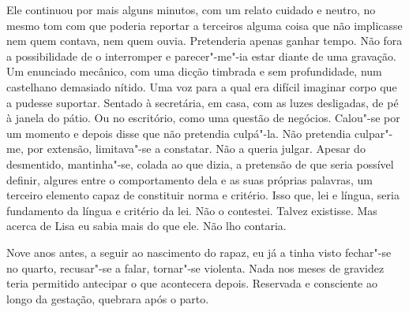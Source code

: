 Ele continuou por mais alguns minutos, com um relato cuidado e neutro,
no mesmo tom com que poderia reportar a terceiros alguma coisa que não
implicasse nem quem contava, nem quem ouvia. Pretenderia apenas ganhar
tempo. Não fora a possibilidade de o interromper e parecer"-me"-ia estar
diante de uma gravação. Um enunciado mecânico, com uma dicção timbrada e
sem profundidade, num castelhano demasiado nítido. Uma voz para a qual
era difícil imaginar corpo que a pudesse suportar. Sentado à secretária,
em casa, com as luzes desligadas, de pé à janela do pátio. Ou no
escritório, como uma questão de negócios. Calou"-se por um momento e
depois disse que não pretendia culpá"-la. Não pretendia culpar"-me, por
extensão, limitava"-se a constatar. Não a queria julgar. Apesar do
desmentido, mantinha"-se, colada ao que dizia, a pretensão de que seria
possível definir, algures entre o comportamento dela e as suas próprias
palavras, um terceiro elemento capaz de constituir norma e critério.
Isso que, lei e língua, seria fundamento da língua e critério da lei.
Não o contestei. Talvez existisse. Mas acerca de Lisa eu sabia mais do
que ele. Não lho contaria.

Nove anos antes, a seguir ao nascimento do rapaz, eu já a tinha visto
fechar"-se no quarto, recusar"-se a falar, tornar"-se violenta. Nada nos
meses de gravidez teria permitido antecipar o que acontecera depois.
Reservada e consciente ao longo da gestação, quebrara após o parto.

